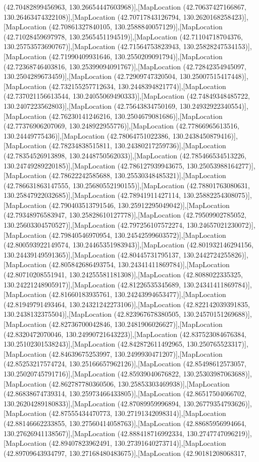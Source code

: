 (42.70482899456963, 130.26654447603968)],[MapLocation (42.70637427166867, 130.26463474322108)],[MapLocation (42.70717843126794, 130.2620168258423)],[MapLocation (42.70861327840105, 130.2588840057129)],[MapLocation (42.71028459697978, 130.2565451194519)],[MapLocation (42.71104718704376, 130.25753573690767)],[MapLocation (42.71564753823943, 130.25828247534153)],[MapLocation (42.71990409931646, 130.2550209091794)],[MapLocation (42.72368746403816, 130.25399094091767)],[MapLocation (42.72842354945097, 130.2504289673459)],[MapLocation (42.72909747320504, 130.25007515417448)],[MapLocation (42.732155257712634, 130.2448394821774)],[MapLocation (42.737021156613544, 130.24055069490333)],[MapLocation (42.74849348485722, 130.2407223562803)],[MapLocation (42.75643834750169, 130.24932922340554)],[MapLocation (42.76230141246216, 130.2504679081686)],[MapLocation (42.77376906207069, 130.248922955776)],[MapLocation (42.77866965613516, 130.24449775436)],[MapLocation (42.78064751022386, 130.2438450879416)],[MapLocation (42.78234838515811, 130.24380217259736)],[MapLocation (42.78354526913898, 130.2448750562033)],[MapLocation (42.785466534513226, 130.24749289220185)],[MapLocation (42.786127939943675, 130.25053988164277)],[MapLocation (42.78622242585688, 130.25530348485321)],[MapLocation (42.786631863147555, 130.25680552190155)],[MapLocation (42.78801763080631, 130.25847922032685)],[MapLocation (42.78941911427114, 130.25882254308075)],[MapLocation (42.790403513791546, 130.25912295049042)],[MapLocation (42.79348976583947, 130.25828610127778)],[MapLocation (42.79509902785052, 130.25603304570527)],[MapLocation (42.797256107572274, 130.24657021230072)],[MapLocation (42.79840546970954, 130.24542599603572)],[MapLocation (42.800593922149574, 130.24465351983943)],[MapLocation (42.801932146294156, 130.24439149591365)],[MapLocation (42.80445731795137, 130.2442724255826)],[MapLocation (42.805842686493754, 130.24341411869784)],[MapLocation (42.80710208551941, 130.24255581181308)],[MapLocation (42.8088022335325, 130.24221248905917)],[MapLocation (42.81226535345689, 130.24341411869784)],[MapLocation (42.81660183935761, 130.24243994653477)],[MapLocation (42.81949791493464, 130.24321242273106)],[MapLocation (42.822142039391835, 130.2438132375504)],[MapLocation (42.823967678380505, 130.24570151269688)],[MapLocation (42.82736700042846, 130.2481906026627)],[MapLocation (42.8320472070046, 130.24990721643223)],[MapLocation (42.837523084676384, 130.25102301538243)],[MapLocation (42.842872611492965, 130.250765523317)],[MapLocation (42.84639675253997, 130.2499930471207)],[MapLocation (42.85253217574724, 130.25166657962126)],[MapLocation (42.85498612573057, 130.25020745791716)],[MapLocation (42.85939040676822, 130.25303987063688)],[MapLocation (42.862787780360506, 130.25853303469938)],[MapLocation (42.86838674739314, 130.25973466433805)],[MapLocation (42.86517504066702, 130.26204289180833)],[MapLocation (42.87089959996894, 130.26779354793626)],[MapLocation (42.87555434470773, 130.27191342098314)],[MapLocation (42.88146662233855, 130.27560414058763)],[MapLocation (42.88685956994664, 130.27626941138567)],[MapLocation (42.888418716992334, 130.2747747096219)],[MapLocation (42.89407823962491, 130.27391640273714)],[MapLocation (42.89709643934797, 130.27168480483675)],[MapLocation (42.90181208068317, 